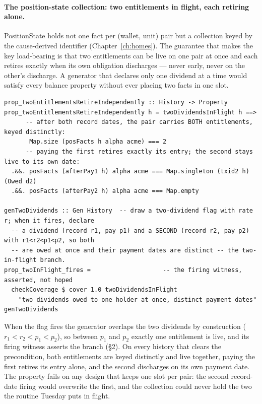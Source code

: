 \paragraph{The position-state collection: two entitlements in flight, each retiring alone.}
PositionState holds not one fact per (wallet, unit) pair but a collection keyed by the
cause-derived identifier (Chapter~\ref{ch:homes}). The guarantee that makes the key
load-bearing is that two entitlements can be live on one pair at once and each retires exactly
when its own obligation discharges --- never early, never on the other's discharge. A generator
that declares only one dividend at a time would satisfy every balance property without ever
placing two facts in one slot.

\begin{lstlisting}
prop_twoEntitlementsRetireIndependently :: History -> Property
prop_twoEntitlementsRetireIndependently h = twoDividendsInFlight h ==>
      -- after both record dates, the pair carries BOTH entitlements, keyed distinctly:
       Map.size (posFacts h alpha acme) === 2
      -- paying the first retires exactly its entry; the second stays live to its own date:
  .&&. posFacts (afterPay1 h) alpha acme === Map.singleton (txid2 h) (Owed d2)
  .&&. posFacts (afterPay2 h) alpha acme === Map.empty

genTwoDividends :: Gen History  -- draw a two-dividend flag with rate r; when it fires, declare
  -- a dividend (record r1, pay p1) and a SECOND (record r2, pay p2) with r1<r2<p1<p2, so both
  -- are owed at once and their payment dates are distinct -- the two-in-flight branch.
prop_twoInFlight_fires =                    -- the firing witness, asserted, not hoped
  checkCoverage $ cover 1.0 twoDividendsInFlight
    "two dividends owed to one holder at once, distinct payment dates" genTwoDividends
\end{lstlisting}

When the flag fires the generator overlaps the two dividends by construction ($r_1<r_2<p_1<p_2$),
so between $p_1$ and $p_2$ exactly one entitlement is live, and its firing witness asserts the
branch (\S 2). On every history that clears the precondition, both
entitlements are keyed distinctly and live together, paying the first retires its entry alone,
and the second discharges on its own payment date. The property fails on any design that keeps
one slot per pair: the second record-date firing would overwrite the first, and the collection
could never hold the two the routine Tuesday puts in flight.

